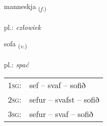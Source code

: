 \documentclass[frontgrid, backgrid]{flacards}\usepackage[]{graphicx}\usepackage[]{xcolor}
\begin{document}
\renewcommand{\flhead}{\vskip5pt \fboxsep=0pt {\small\bfseries\footnotesize Nafnorð | Noun}}
\renewcommand{\fcfoot}{\vskip5pt \fboxsep=0pt \hspace{2pt}{\small\bfseries\footnotesize 1K}}

\renewcommand{\blhead}{\vskip5pt {\small\bfseries\footnotesize Nafnorð | Noun }}
\renewcommand{\bcfoot}{\vskip5pt \hspace{2pt}{\small\bfseries\footnotesize 1K}}


{manneskja \small{\textsubscript{(\textit{f.})}} \\[1ex] %
\textphonetic{[manɛsca]} \\
pl.: \emph{człowiek} \\  [2ex]
\renewcommand*{\arraystretch}{0.8}
}

\renewcommand{\flhead}{\vskip5pt \fboxsep=0pt {\small\bfseries\footnotesize Sagnorð | Verb}}
\renewcommand{\fcfoot}{\vskip5pt \fboxsep=0pt \hspace{2pt}{\small\bfseries\footnotesize 1K}}

\renewcommand{\blhead}{\vskip5pt {\small\bfseries\footnotesize Sagnorð | Verb }}
\renewcommand{\bcfoot}{\vskip5pt \hspace{2pt}{\small\bfseries\footnotesize 1K}}


{sofa \small{\textsubscript{(\textit{v.})}} \\[1ex] %
\textphonetic{[sɔːva]} \\
pl.: \emph{spać} \\  [2ex]
\renewcommand*{\arraystretch}{0.8}
\begin{tabular}{p{1cm}l}
\textsc{1sg}: & sef -- svaf -- sofið \\ 
\textsc{2sg}: & sefur -- svafst -- sofið \\ 
\textsc{3sg}: & sefur -- svaf -- sofið \\ 
\end{tabular}
}
\end{document}
